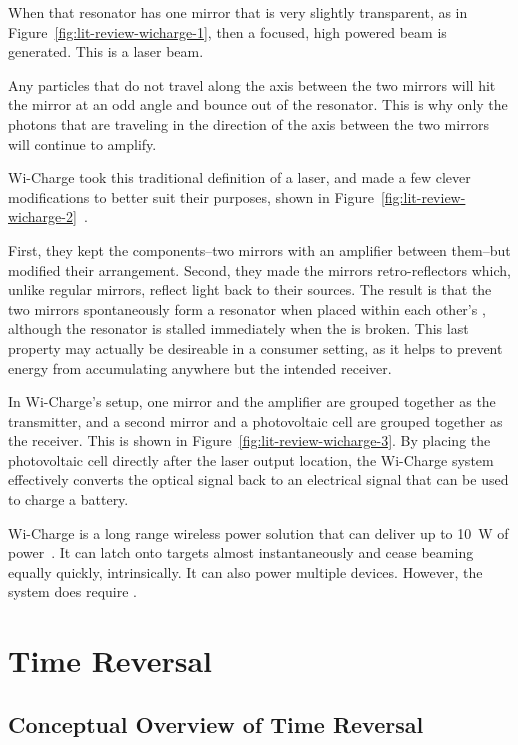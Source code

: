 When that resonator has one mirror that is very slightly transparent, as in Figure~\ref{fig:lit-review-wicharge-1}, then a focused, high powered beam is generated. This is a laser beam.

Any particles that do not travel along the axis between the two mirrors will hit the mirror at an odd angle and bounce out of the resonator. This is why only the photons that are traveling in the direction of the axis between the two mirrors will continue to amplify.

Wi-Charge took this traditional definition of a laser, and made a few clever modifications to better suit their purposes, shown in Figure~\ref{fig:lit-review-wicharge-2}~\cite{wicharge2016}.

First, they kept the components--two mirrors with an amplifier between them--but modified their arrangement. Second, they made the mirrors retro-reflectors which, unlike regular mirrors, reflect light back to their sources. The result is that the two mirrors spontaneously form a resonator when placed within each other's \los{}, although the resonator is stalled immediately when the \los{} is broken. This last property may actually be desireable in a consumer setting, as it helps to prevent energy from accumulating anywhere but the intended receiver.

In Wi-Charge's setup, one mirror and the amplifier are grouped together as the transmitter, and a second mirror and a photovoltaic cell are grouped together as the receiver. This is shown in Figure~\ref{fig:lit-review-wicharge-3}. By placing the photovoltaic cell directly after the laser output location, the Wi-Charge system effectively converts the optical signal back to an electrical signal that can be used to charge a battery.

Wi-Charge is a long range wireless power solution that can deliver up to 10~W of power~\cite{wicharge2016}. It can latch onto targets almost instantaneously and cease beaming equally quickly, intrinsically. It can also power multiple devices. However, the system does require \los{}.

\section{Time Reversal}
\label{lit-review-tr}

\subsection{Conceptual Overview of Time Reversal}


